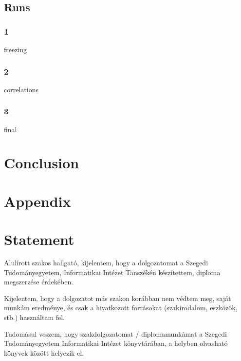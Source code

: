 \documentclass[12pt]{report}
\begin{document}
\section{Runs}
\subsection{1}
freezing
\subsection{2}
correlations
\subsection{3}
final
\chapter{Conclusion}
\chapter{Appendix}
\chapter*{Statement}



\noindent
Alulírott \makebox[4cm]{\dotfill} szakos hallgató, kijelentem, hogy a dolgozatomat a Szegedi Tudományegyetem, Informatikai Intézet \makebox[4cm]{\dotfill} Tanszékén készítettem, \makebox[4cm]{\dotfill} diploma megszerzése érdekében.

Kijelentem, hogy a dolgozatot más szakon korábban nem védtem meg, saját munkám eredménye, és csak a hivatkozott forrásokat (szakirodalom, eszközök, stb.) használtam fel.

Tudomásul veszem, hogy szakdolgozatomat / diplomamunkámat a Szegedi Tudományegyetem Informatikai Intézet könyvtárában, a helyben olvasható könyvek között helyezik el.
\end{document}
